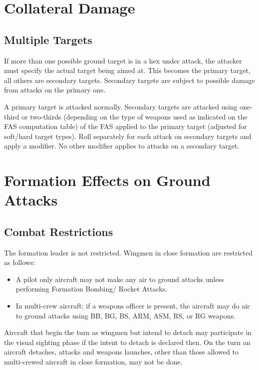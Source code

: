 \begin{advancedrules}

\section{Collateral Damage}
\label{rule:collateral-damage}

\subsection{Multiple Targets} If more than one possible ground target is in a hex under attack, the attacker must specify the actual target being aimed at. This becomes the primary target, all others are secondary targets. Secondary targets are subject to possible damage from attacks on the primary one.

A primary target is attacked normally. Secondary targets are attacked using one-third or two-thirds (depending on the type of weapons used as indicated on the FAS computation table) of the FAS applied to the primary target (adjusted for soft/hard target types). Roll separately for each attack on secondary targets and apply a  modifier.  No other modifier applies to attacks on a secondary target.

\section{Formation Effects on Ground Attacks}

\subsection{Combat Restrictions} The formation leader is not restricted. Wingmen in close formation are restricted as follows:
\begin{itemize}
\item A pilot only aircraft may not make any air to ground attacks unless performing Formation Bombing/ Rocket Attacks.
\item In multi-crew aircraft; if a weapons officer is present, the aircraft may do air to ground attacks using BB, BG, BS, ARM, ASM, RS, or RG weapons.
\end{itemize}

Aircraft that begin the turn as wingmen but intend to detach may participate in the visual sighting phase if the intent to detach is declared then. On the turn an aircraft detaches, attacks and weapons launches, other than those allowed to multi-crewed aircraft in close formation, may not be done.


\end{advancedrules}
